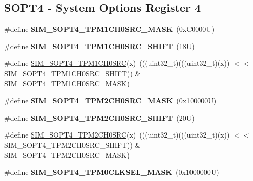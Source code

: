 \subsection*{S\+O\+P\+T4 -\/ System Options Register 4}
\begin{DoxyCompactItemize}
\item 
\mbox{\label{group___s_i_m___register___masks_ga9897da591b25b25a121a2321c5515923}} 
\#define {\bfseries S\+I\+M\+\_\+\+S\+O\+P\+T4\+\_\+\+T\+P\+M1\+C\+H0\+S\+R\+C\+\_\+\+M\+A\+SK}~(0x\+C0000\+U)
\item 
\mbox{\label{group___s_i_m___register___masks_ga79b1e63028e073fbe12351561f1b7645}} 
\#define {\bfseries S\+I\+M\+\_\+\+S\+O\+P\+T4\+\_\+\+T\+P\+M1\+C\+H0\+S\+R\+C\+\_\+\+S\+H\+I\+FT}~(18\+U)
\item 
\#define \mbox{\hyperlink{group___s_i_m___register___masks_ga5723b75e6315f4f95b6ab3709a851377}{S\+I\+M\+\_\+\+S\+O\+P\+T4\+\_\+\+T\+P\+M1\+C\+H0\+S\+RC}}(x)~(((uint32\+\_\+t)(((uint32\+\_\+t)(x)) $<$$<$ S\+I\+M\+\_\+\+S\+O\+P\+T4\+\_\+\+T\+P\+M1\+C\+H0\+S\+R\+C\+\_\+\+S\+H\+I\+FT)) \& S\+I\+M\+\_\+\+S\+O\+P\+T4\+\_\+\+T\+P\+M1\+C\+H0\+S\+R\+C\+\_\+\+M\+A\+SK)
\item 
\mbox{\label{group___s_i_m___register___masks_ga871c6061ab30b4ad99b919e35e86c081}} 
\#define {\bfseries S\+I\+M\+\_\+\+S\+O\+P\+T4\+\_\+\+T\+P\+M2\+C\+H0\+S\+R\+C\+\_\+\+M\+A\+SK}~(0x100000\+U)
\item 
\mbox{\label{group___s_i_m___register___masks_ga85ccc239517b7633b2c0a164b8d5cbf3}} 
\#define {\bfseries S\+I\+M\+\_\+\+S\+O\+P\+T4\+\_\+\+T\+P\+M2\+C\+H0\+S\+R\+C\+\_\+\+S\+H\+I\+FT}~(20\+U)
\item 
\#define \mbox{\hyperlink{group___s_i_m___register___masks_ga67e4facef308f4e1a3aaa6f8cc56494a}{S\+I\+M\+\_\+\+S\+O\+P\+T4\+\_\+\+T\+P\+M2\+C\+H0\+S\+RC}}(x)~(((uint32\+\_\+t)(((uint32\+\_\+t)(x)) $<$$<$ S\+I\+M\+\_\+\+S\+O\+P\+T4\+\_\+\+T\+P\+M2\+C\+H0\+S\+R\+C\+\_\+\+S\+H\+I\+FT)) \& S\+I\+M\+\_\+\+S\+O\+P\+T4\+\_\+\+T\+P\+M2\+C\+H0\+S\+R\+C\+\_\+\+M\+A\+SK)
\item 
\mbox{\label{group___s_i_m___register___masks_gae889ccb89e5c139f002b6a62d21628a9}} 
\#define {\bfseries S\+I\+M\+\_\+\+S\+O\+P\+T4\+\_\+\+T\+P\+M0\+C\+L\+K\+S\+E\+L\+\_\+\+M\+A\+SK}~(0x1000000\+U)

\end{DoxyCompactItemize}
